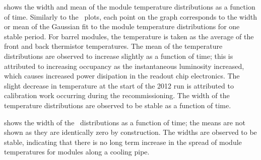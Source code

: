  shows the width and mean of the module temperature
distributions as a function of time. Similarly to the \deltat\ plots, each point
on the graph corresponds to the width or mean of the Gaussian fit to the module
temperature distributions for one stable period. For barrel modules, the
temperature is taken as the average of the front and back thermistor
temperatures. The mean of the temperature distributions are observed to increase
slightly as a function of time; this is attributed to increasing occupancy as
the instantaneous luminosity increased, which causes increased power disipation
in the readout chip electronics. The slight decrease in temperature at the start
of the 2012 run is attributed to calibration work occurring during the
recommissioning. The width of the temperature distributions are observed to be
stable as a function of time.

 shows the width of the \tdiff\
distributions as a function of time; the means are not shown as they are
identically zero by construction. The widths are observed to be stable, indicating
that there is no long term increase in the spread of module temperatures for
modules along a cooling pipe.

